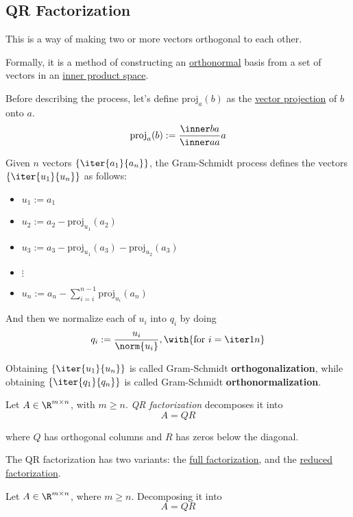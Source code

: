 \subsection{QR Factorization}\label{ab6fe9e}

\label{b75ef8e}

This is a way of making two or more vectors orthogonal to each other.

Formally, it is a method of constructing an \href{d90fcb1}{orthonormal} basis
from a set of vectors in an \href{b9935c8}{inner product space}.

Before describing the process, let's define $\mathrm{proj}_a(b)$ as the
\href{fc332ef}{vector projection} of $b$ onto $a$.
$$
  {\mathrm{proj}}_{a}(b):=\frac{\inner ba}{\inner aa}a
$$

Given $n$ vectors $\{\iter{a_1}{a_n}\}$, the Gram-Schmidt process defines the
vectors $\{\iter{u_1}{u_n}\}$ as follows:
\begin{itemize}
  \item $u_1:=a_1$
  \item $u_2:=a_2-\mathrm{proj}_{u_1}(a_2)$
  \item $u_3:=a_3-\mathrm{proj}_{u_1}(a_3)-\mathrm{proj}_{u_2}(a_3)$
  \item [] $\vdots$
  \item $u_n:=a_n-\sum_{i=i}^{n-1}\mathrm{proj}_{u_i}(a_n)$
\end{itemize}

And then we normalize each of $u_i$ into $q_i$ by doing
$$
  q_i:=\frac{u_i}{\norm{u_i}},\with{\text{for } i=\iter1n}
$$

Obtaining $\{\iter{u_1}{u_n}\}$ is called Gram-Schmidt
\textbf{orthogonalization}, while obtaining $\{\iter{q_1}{q_n}\}$ is called
Gram-Schmidt \textbf{orthonormalization}.

\label{c465f7c}

Let $A\in\R^{m\times n}$, with $m\geq n$. \textit{QR factorization} decomposes
it into
$$
  A=QR
$$

where $Q$ has orthogonal columns and $R$ has zeros below the diagonal.

The QR factorization has two variants: the \href{c43e60c}{full factorization},
and the \href{c465f7c}{reduced factorization}.

\label{c43e60c}

Let $A\in\R^{m\times n}$, where $m\geq n$. Decomposing it into
$$
  A=QR
$$

